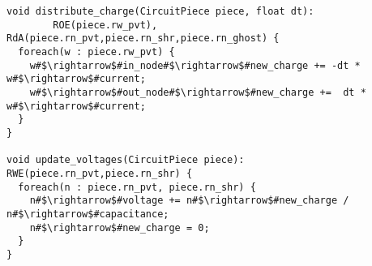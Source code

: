 \begin{lstlisting}[float={t},label={lst:code_ex},caption={Circuit simulation.}]
void distribute_charge(CircuitPiece piece, float dt):
        ROE(piece.rw_pvt), RdA(piece.rn_pvt,piece.rn_shr,piece.rn_ghost) {
  foreach(w : piece.rw_pvt) {
    w#$\rightarrow$#in_node#$\rightarrow$#new_charge += -dt * w#$\rightarrow$#current;
    w#$\rightarrow$#out_node#$\rightarrow$#new_charge +=  dt * w#$\rightarrow$#current;
  }
}

void update_voltages(CircuitPiece piece): RWE(piece.rn_pvt,piece.rn_shr) {
  foreach(n : piece.rn_pvt, piece.rn_shr) {
    n#$\rightarrow$#voltage += n#$\rightarrow$#new_charge / n#$\rightarrow$#capacitance;
    n#$\rightarrow$#new_charge = 0;
  }
}
\end{lstlisting}
